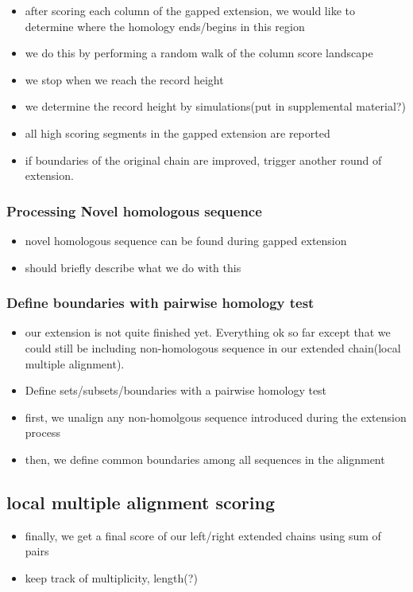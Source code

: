 \documentclass{llncs}
\begin{document}
\begin{itemize}
\item after scoring each column of the gapped extension, we would like
to determine where the homology ends/begins in this region
\item we do this by performing a random walk of the column score landscape
\item we stop when we reach the record height
\item we determine the record height by simulations(put in supplemental material?)
\item all high scoring segments in the gapped extension are reported
\item if boundaries of the original chain are improved, trigger another round of extension.
\end{itemize}

\subsubsection{Processing Novel homologous sequence}    
\begin{itemize}
\item novel homologous sequence can be found during gapped extension
\item should briefly describe what we do with this 
\end{itemize}
\subsubsection{Define boundaries with pairwise homology test}
\begin{itemize}
\item our extension is not quite finished yet. Everything ok so far except that we could
still be including non-homologous sequence in our extended chain(local multiple alignment).
\item Define sets/subsets/boundaries with a pairwise homology test
\item first, we unalign any non-homolgous sequence introduced during the extension process
\item then, we define common boundaries among all sequences in the alignment
\end{itemize}
\subsection{local multiple alignment scoring}
\begin{itemize}
\item finally, we get a final score of our left/right extended chains using sum of pairs
\item keep track of multiplicity, length(?)
\end{itemize}
\end{document}
